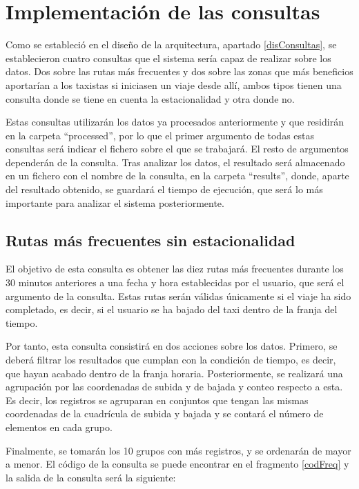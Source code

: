 \section{Implementación de las consultas \label{impConsultas}}
Como se estableció en el diseño de la arquitectura, apartado \ref{disConsultas}, se establecieron cuatro consultas que el sistema sería capaz de realizar sobre los datos. Dos sobre las rutas más frecuentes y dos sobre las zonas que más beneficios aportarían a los taxistas si iniciasen un viaje desde allí, ambos tipos tienen una consulta donde se tiene en cuenta la estacionalidad y otra donde no.

Estas consultas utilizarán los datos ya procesados anteriormente y que residirán en la carpeta ``processed'', por lo que el primer argumento de todas estas consultas será indicar el fichero sobre el que se trabajará. El resto de argumentos dependerán de la consulta. Tras analizar los datos, el resultado será almacenado en un fichero con el nombre de la consulta, en la carpeta ``results'', donde, aparte del resultado obtenido, se guardará el tiempo de ejecución, que será lo más importante para analizar el sistema posteriormente.

\subsection{Rutas más frecuentes sin estacionalidad \label{freqSinExplicacion}}
El objetivo de esta consulta es obtener las diez rutas más frecuentes durante los 30 minutos anteriores a una fecha y hora establecidas por el usuario, que será el argumento de la consulta. Estas rutas serán válidas únicamente si el viaje ha sido completado, es decir, si el usuario se ha bajado del taxi dentro de la franja del tiempo. 

Por tanto, esta consulta consistirá en dos acciones sobre los datos. Primero, se deberá filtrar los resultados que cumplan con la condición de tiempo, es decir, que hayan acabado dentro de la franja horaria. Posteriormente, se realizará una agrupación por las coordenadas de subida y de bajada y conteo respecto a esta. Es decir, los registros se agruparan en conjuntos que tengan las mismas coordenadas de la cuadrícula de subida y bajada y se contará el número de elementos en cada grupo.

Finalmente, se tomarán los 10 grupos con más registros, y se ordenarán de mayor a menor. El código de la consulta se puede encontrar en el fragmento \ref{codFreq} y la salida de la consulta será la siguiente:

